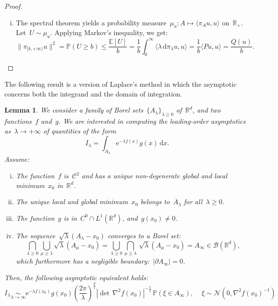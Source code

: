 \documentclass[10pt]{article}
\renewcommand{\d}{\mathrm{d}}
\newcommand{\e}{\mathrm{e}}
\newcommand{\R}{\mathbb{R}}
\newcommand{\1}{\mathbbm 1}
\newtheorem{lemma}{Lemma}
\begin{document}
\begin{proof}
\begin{enumerate}[i)]
{            }
            \item{
                The spectral theorem yields a probability measure~$\mu_u : A \mapsto \langle \pi_A u,u\rangle$ on~$\R_+$. Let~$U\sim \mu_u$.
                Applying Markov's inequality, we get:
                \begin{equation}
                    \|\pi_{[b,+\infty)}u\|^2 = \mathbb P (U \geq b) \leq \frac{\mathbb E[U]}{b} = \frac1b\int_0^\infty \langle \lambda\,\d\pi_{\lambda}u,u\rangle = \frac1b\langle Pu,u\rangle = \frac{Q(u)}b.
                \end{equation}
            }
        \end{enumerate}        
    \end{proof}

    The following result is a version of Laplace's method in which the asymptotic concerns both the integrand and the domain of integration.
    \begin{lemma}
        We consider a family of Borel sets~$\{A_\lambda\}_{\lambda\geq 0}$ of~$\R^d$, and two functions~$f$ and~$g$.
        We are interested in computing the leading-order asymptotics as~$\lambda\to+\infty$ of quantities of the form 
       ~$$I_\lambda = \int_{A_\lambda}\e^{-\lambda f(x)}g(x)\,\d x.$$
        Assume:
        \begin{enumerate}[i)]
            \item{\label{hyp:fc2}The function~$f$ is~$\mathcal C^2$ and has a unique non-degenerate global and local minimum~$x_0$ in~$\R^d$.}
            \item{\label{hyp:strong_min}The unique local and global minimum~$x_0$ belongs to~$\overline A_\lambda$ for all~$\lambda\geq 0$.}
            \item{\label{hyp:gc0}The function~$g$ is in~$C^0\cap L^1 (\R^d)$, and~$g(x_0)\neq 0$.}
            \item{\label{hyp:domain_conv}The sequence~$\sqrt{\lambda}(A_\lambda - x_0)$ converges to a Borel set:~$$\bigcap_{\lambda \geq 0} \bigcup_{\mu\geq\lambda} \sqrt{\lambda}(A_\mu-x_0) = \bigcup_{\lambda \geq 0} \bigcap_{\mu \geq \lambda}\, \sqrt\lambda ( A_\mu - x_0) = A_\infty \in \mathcal{B}(\R^d),$$
            which furthermore has a negligible boundary:~$\left|\partial A_\infty \right|=0$.}
        \end{enumerate}
        Then, the following asymptotic equivalent holds:
        \begin{equation}
            \label{eq:laplace_method}
            I_\lambda \underset{\lambda\to\infty}{\sim} \e^{-\lambda f(x_0)}g(x_0)\left(\frac{2\pi}{\lambda}\right)^{\frac d2}\left|\det\,\nabla^2 f(x_0)\right|^{-\frac12}\,\mathbb{P}\left(\xi \in A_\infty\right),\quad\,{\xi\sim \mathcal N\left(0,\nabla^2 f(x_0)^{-1}\right)}
        \end{equation}
    \end{lemma}
\end{document}
